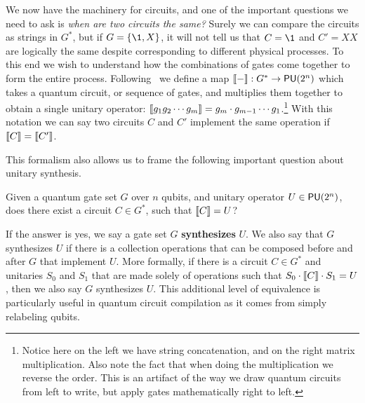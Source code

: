 We now have the machinery for circuits, and one of the important questions we need to ask is \emph{when are two circuits the same?}
Surely we can compare the circuits as strings in $G^*$, but if $G = \qty{\1, X}$, it will not tell us that $C = \1$ and $C' = XX$ are logically the same despite corresponding to different physical processes.
To this end we wish to understand how the combinations of gates come together to form the entire process.
Following~\cite{formalcircuit} we define a map $\llbracket-\rrbracket: G^* \to \mathsf{PU} (2^n)$ which takes a quantum circuit, or sequence of gates, and multiplies them together to obtain a single unitary operator: $\llbracket g_1g_2\cdots g_m\rrbracket = g_m\cdot g_{m-1} \cdots g_1$.\footnote{Notice here on the left we have string concatenation, and on the right matrix multiplication. Also note the fact that when doing the multiplication we reverse the order. This is an artifact of the way we draw quantum circuits from left to write, but apply gates mathematically right to left.}
With this notation we can say two circuits $C$ and $C'$ implement the same operation if $\llbracket C\rrbracket = \llbracket C'\rrbracket$.

This formalism also allows us to frame the following important question about unitary synthesis.
\begin{question}\label{qu:synthesis}
    Given a quantum gate set $G$ over $n$ qubits, and unitary operator $U \in \mathsf{PU} (2^n)$, does there exist a circuit $C\in G^*$, such that $\llbracket C\rrbracket = U$?
\end{question}
If the answer is yes, we say a gate set $G$ \textbf{synthesizes} $U$.
We also say that $G$ synthesizes $U$ if there is a collection \SWAP{} operations that can be composed before and after $G$ that implement $U$.
More formally, if there is a circuit $C \in G^*$ and unitaries $S_0$ and $S_1$ that are made solely of \SWAP{} operations such that $S_0 \cdot \llbracket C\rrbracket \cdot S_1 = U$, then we also say $G$ synthesizes $U$.
This additional level of equivalence is particularly useful in quantum circuit compilation as it comes from simply relabeling qubits.

